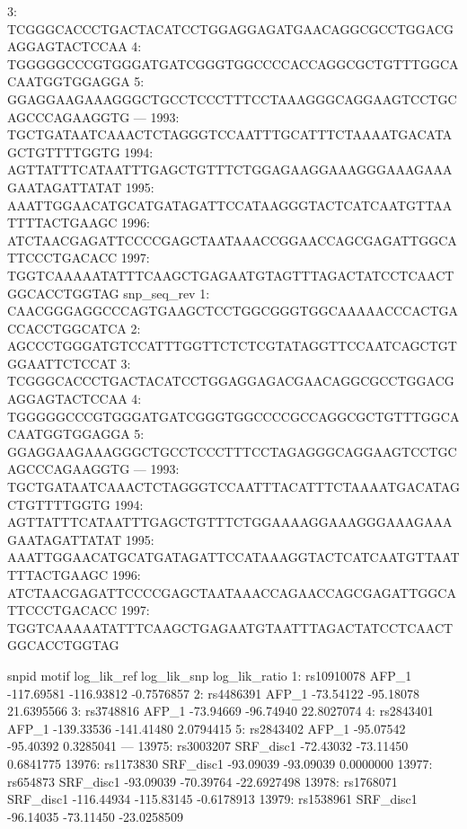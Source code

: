 \documentclass[a4paper,10pt]{article}
\begin{document}
\begin{Schunk}
\begin{Soutput}
   3: TCGGGCACCCTGACTACATCCTGGAGGAGATGAACAGGCGCCTGGACGAGGAGTACTCCAA
   4: TGGGGGCCCGTGGGATGATCGGGTGGCCCCACCAGGCGCTGTTTGGCACAATGGTGGAGGA
   5: GGAGGAAGAAAGGGCTGCCTCCCTTTCCTAAAGGGCAGGAAGTCCTGCAGCCCAGAAGGTG
  ---                                                              
1993: TGCTGATAATCAAACTCTAGGGTCCAATTTGCATTTCTAAAATGACATAGCTGTTTTGGTG
1994: AGTTATTTCATAATTTGAGCTGTTTCTGGAGAAGGAAAGGGAAAGAAAGAATAGATTATAT
1995: AAATTGGAACATGCATGATAGATTCCATAAGGGTACTCATCAATGTTAATTTTACTGAAGC
1996: ATCTAACGAGATTCCCCGAGCTAATAAACCGGAACCAGCGAGATTGGCATTCCCTGACACC
1997: TGGTCAAAAATATTTCAAGCTGAGAATGTAGTTTAGACTATCCTCAACTGGCACCTGGTAG
                                                        snp_seq_rev
   1: CAACGGGAGGCCCAGTGAAGCTCCTGGCGGGTGGCAAAAACCCACTGACCACCTGGCATCA
   2: AGCCCTGGGATGTCCATTTGGTTCTCTCGTATAGGTTCCAATCAGCTGTGGAATTCTCCAT
   3: TCGGGCACCCTGACTACATCCTGGAGGAGACGAACAGGCGCCTGGACGAGGAGTACTCCAA
   4: TGGGGGCCCGTGGGATGATCGGGTGGCCCCGCCAGGCGCTGTTTGGCACAATGGTGGAGGA
   5: GGAGGAAGAAAGGGCTGCCTCCCTTTCCTAGAGGGCAGGAAGTCCTGCAGCCCAGAAGGTG
  ---                                                              
1993: TGCTGATAATCAAACTCTAGGGTCCAATTTACATTTCTAAAATGACATAGCTGTTTTGGTG
1994: AGTTATTTCATAATTTGAGCTGTTTCTGGAAAAGGAAAGGGAAAGAAAGAATAGATTATAT
1995: AAATTGGAACATGCATGATAGATTCCATAAAGGTACTCATCAATGTTAATTTTACTGAAGC
1996: ATCTAACGAGATTCCCCGAGCTAATAAACCAGAACCAGCGAGATTGGCATTCCCTGACACC
1997: TGGTCAAAAATATTTCAAGCTGAGAATGTAATTTAGACTATCCTCAACTGGCACCTGGTAG
\end{Soutput}
\begin{Soutput}
            snpid     motif log_lik_ref log_lik_snp log_lik_ratio
    1: rs10910078     AFP_1  -117.69581  -116.93812    -0.7576857
    2:  rs4486391     AFP_1   -73.54122   -95.18078    21.6395566
    3:  rs3748816     AFP_1   -73.94669   -96.74940    22.8027074
    4:  rs2843401     AFP_1  -139.33536  -141.41480     2.0794415
    5:  rs2843402     AFP_1   -95.07542   -95.40392     0.3285041
   ---                                                           
13975:  rs3003207 SRF_disc1   -72.43032   -73.11450     0.6841775
13976:  rs1173830 SRF_disc1   -93.09039   -93.09039     0.0000000
13977:   rs654873 SRF_disc1   -93.09039   -70.39764   -22.6927498
13978:  rs1768071 SRF_disc1  -116.44934  -115.83145    -0.6178913
13979:  rs1538961 SRF_disc1   -96.14035   -73.11450   -23.0258509
\end{Soutput}
\end{Schunk}
\end{document}
